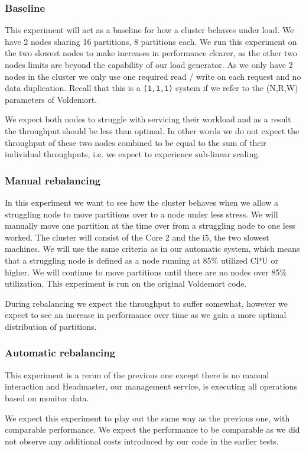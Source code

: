 \subsubsection{Baseline}
This experiment will act as a baseline for how a cluster behaves under load. We have 2 nodes sharing 16 partitions, 8 partitions each. We run this experiment on the two slowest nodes to make increases in performance clearer, as the other two nodes limits are beyond the capability of our load generator. As we only have 2 nodes in the cluster we only use one required read / write on each request and no data duplication. Recall that this is a \texttt{(1,1,1)} system if we refer to the (N,R,W) parameters of Voldemort.

We expect both nodes to struggle with servicing their workload and as a result the throughput should be less than optimal. In other words we do not expect the throughput of these two nodes combined to be equal to the sum of their individual throughputs, i.e. we expect to experience sub-linear scaling. 

\subsubsection{Manual rebalancing}
In this experiment we want to see how the cluster behaves when we allow a struggling node to move partitions over to a node under less stress. We will manually move one partition at the time over from a struggling node to one less worked. The cluster will consist of the Core 2 and the i5, the two slowest machines. We will use the same criteria as in our automatic system, which means that a struggling node is defined as a node running at 85\% utilized CPU or higher. We will continue to move partitions until there are no nodes over 85\% utilization. This experiment is run on the original Voldemort code. 

During rebalancing we expect the throughput to suffer somewhat, however we expect to see an increase in performance over time as we gain a more optimal distribution of partitions. 

\subsubsection{Automatic rebalancing}
This experiment is a rerun of the previous one except there is no manual interaction and Headmaster, our management service, is executing all operations based on monitor data.

We expect this experiment to play out the same way as the previous one, with comparable performance. We expect the performance to be comparable as we did not observe any additional costs introduced by our code in the earlier tests.

